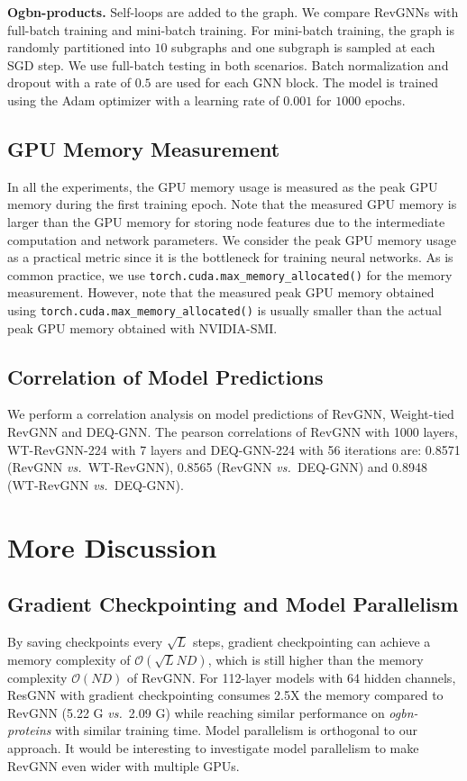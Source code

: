 \documentclass{article}
\newcommand{\vs}{\emph{vs.~}}
\newcommand{\mysection}[1]{\vspace{0pt}\noindent\textbf{#1.}}
\begin{document}
\mysection{Ogbn-products}
Self-loops are added to the graph. We compare RevGNNs with full-batch training and mini-batch training. For mini-batch training, the graph is randomly partitioned into $10$ subgraphs and one subgraph is sampled at each SGD step. We use full-batch testing in both scenarios. Batch normalization and dropout with a rate of $0.5$ are used for each GNN block. The model is trained using the Adam optimizer with a learning rate of $0.001$ for $1000$ epochs.

\subsection{GPU Memory Measurement}
In all the experiments, the GPU memory usage is measured as the peak GPU memory during the first training epoch. Note that the measured GPU memory is larger than the GPU memory for storing node features due to the intermediate computation and network parameters. We consider the peak GPU memory usage as a practical metric since it is the bottleneck for training neural networks. As is common practice, we use \texttt{torch.cuda.max\_memory\_allocated()} for the memory measurement. However, note that the measured peak GPU memory obtained using \texttt{torch.cuda.max\_memory\_allocated()} is usually smaller than the actual peak GPU memory obtained with NVIDIA-SMI.

\subsection{Correlation of Model Predictions}
We perform a correlation analysis on model predictions of RevGNN, Weight-tied RevGNN and DEQ-GNN. The pearson correlations of RevGNN with 1000 layers, WT-RevGNN-224 with 7 layers and DEQ-GNN-224 with 56 iterations are: 0.8571 (RevGNN \vs WT-RevGNN), 0.8565 (RevGNN \vs DEQ-GNN) and 0.8948 (WT-RevGNN \vs DEQ-GNN).

\section{More Discussion}

\subsection{Gradient Checkpointing and Model Parallelism}
By saving checkpoints every $\sqrt{L}$ steps, gradient checkpointing can achieve a memory complexity of $\mathcal{O}(\sqrt{L}ND)$, which is still higher than the memory complexity $\mathcal{O}(ND)$ of RevGNN. For 112-layer models with 64 hidden channels, ResGNN with gradient checkpointing consumes 2.5X the memory compared to RevGNN (5.22 G \vs 2.09 G) while reaching similar performance on \emph{ogbn-proteins} with similar training time.
Model parallelism is orthogonal to our approach. It would be interesting to investigate model parallelism to make RevGNN even wider with multiple GPUs.
\end{document}
